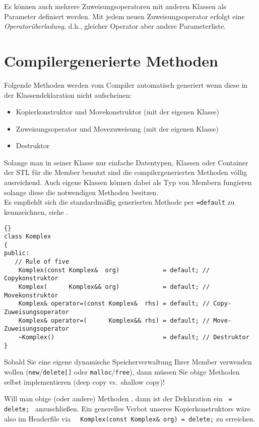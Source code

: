 Es können auch mehrere Zuweisungsoperatoren mit anderen Klassen als Parameter
definiert werden. Mit jedem neuen Zuweisungsoperator erfolgt eine
\emph{Operatorüberladung}, d.h., gleicher Operator aber andere
Parameterliste.

%
\section{Compilergenerierte Methoden}
\label{p:9.5}
Folgende Methoden werden vom Compiler {automatisch} generiert wenn diese
in der Klassendeklaration nicht aufscheinen:
\begin{itemize}
    \item Kopierkonstruktor und Movekonstruktor (mit der eigenen Klasse)
    \item Zuweisungsoperator und Movezuweisung (mit der eigenen Klasse)
    \item Destruktor
\end{itemize}
Solange man in seiner Klasse nur einfache Datentypen, Klassen oder Container der STL
für die Member benutzt sind die compilergenerierten Methoden völlig ausreichend.
Auch eigene Klassen können dabei als Typ von Membern fungieren solange diese die
notwendigen Methoden besitzen. 
\\
Es empfiehlt sich die standardmäßig generierten Methode per \verb|=default| zu kennzeichnen, 
siehe .
%
\begin{lstlisting}[caption=Rule of Five: explizit alles default,label=lst:9_5_1,basicstyle=\scriptsize]{}
class Komplex
{
public:
   // Rule of five
    Komplex(const Komplex&  org)            = default; // Copykonstruktor
    Komplex(      Komplex&& org)            = default; // Movekonstruktor
    Komplex& operator=(const Komplex&  rhs) = default; // Copy-Zuweisungsoperator
    Komplex& operator=(      Komplex&& rhs) = default; // Move-Zuweisungsoperator
    ~Komplex()                              = default; // Destruktor
}
\end{lstlisting}

Sobald Sie eine eigene dynamische Speicherverwaltung Ihrer Member verwenden wollen
(\verb|new|/\verb|delete[]| oder \verb|malloc|/\verb|free|), dann müssen
Sie obige  Methoden selbst implementieren (deep copy vs.\  shallow copy)!

Will man obige (oder andere) Methoden 
, 
dann ist der Deklaration ein \verb| = delete; | anzuschließen.
Ein generelles Verbot unseres Kopierkonstruktors wäre also im Headerfile
via \verb|  Komplex(const Komplex& org) = delete;| zu erreichen.

